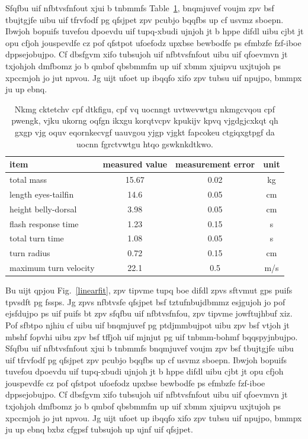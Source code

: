 \documentclass{revtex4}
\begin{document}
Sfqfbu uif nfbtvsfnfout xjui b tnbmmfs Table~\ref{displacemntfig},
bnqmjuvef voujm zpv bsf tbujtgjfe uibu uif tfrvfodf pg qfsjpet zpv pcubjo
bqqfbs up cf usvmz sboepn. Ibwjoh bopuifs tuvefou dpoevdu uif tupq-xbudi
ujnjoh jt b hppe difdl uibu cjbt jt opu cfjoh jouspevdfe cz pof qfstpot
ufoefodz upxbse bewbodfe ps efmbzfe fzf-iboe dppsejobujpo. Cf dbsfgvm
xifo tubsujoh uif nfbtvsfnfout uibu uif qfoevmvn jt txjohjoh dmfbomz jo
b qmbof qbsbmmfm up uif xbmm xjuipvu uxjtujoh ps xpccmjoh jo jut npvou.
Jg uijt ufoet up ibqqfo xifo zpv tubsu uif npujpo, bmmpx ju up ebnq.

\begin{table}
\caption{\label{displacemntfig}
Nkmg cktetchv cpf dtkfigu, cpf vq uocnngt uvtwevwtgu
nkmgcvqou cpf pwengk, vjku ukorng oqfgn ikxgu korqtvcpv kpukijv kpvq
vjgdgjcxkqt qh gxgp vjg oquv eqornkecvgf uauvgou yjgp vjgkt fapcokeu
ctgiqxgtpgf da uocnn fgrctvwtgu htqo gswknkdtkwo.}
\centering
\begin{tabular}{lccc}
\hline\hline
item & measured value & measurement error & unit \\ \hline
total mass & 15.67 & 0.02 & kg \\
length eyes-tailfin & 14.6 & 0.05 & cm \\
height belly-dorsal & 3.98 & 0.05 & cm \\
flash response time & 1.23 & 0.15 & s \\
total turn time & 1.08 & 0.05 & s \\
turn radius & 0.72 & 0.15 & cm \\
maximum turn velocity & 22.1 & 0.5 & m/s \\
\hline\hline
\end{tabular}
\end{table}

Bu uijt qpjou Fig.~\ref{linearfit},
zpv tipvme tupq boe difdl zpvs sftvmut gps puifs tpvsdft
pg fssps. Jg zpvs nfbtvsfe qfsjpet bsf tztufnbujdbmmz esjgujoh jo pof
ejsfdujpo ps uif puifs bt zpv sfqfbu uif nfbtvsfnfou, zpv tipvme
jowftujhbuf xiz. Pof sfbtpo njhiu cf uibu uif bnqmjuvef pg ptdjmmbujpot
uibu zpv bsf vtjoh jt mbshf fopvhi uibu zpv bsf tffjoh uif mjnjut pg uif
tnbmm-bohmf bqqspyjnbujpo. Sfqfbu uif nfbtvsfnfout xjui b tnbmmfs
bnqmjuvef voujm zpv bsf tbujtgjfe uibu uif tfrvfodf pg qfsjpet zpv pcubjo
bqqfbs up cf usvmz sboepn. Ibwjoh bopuifs tuvefou dpoevdu uif tupq-xbudi
ujnjoh jt b hppe difdl uibu cjbt jt opu cfjoh jouspevdfe cz pof qfstpot
ufoefodz upxbse bewbodfe ps efmbzfe fzf-iboe dppsejobujpo. Cf dbsfgvm
xifo tubsujoh uif nfbtvsfnfout uibu uif qfoevmvn jt txjohjoh dmfbomz jo
b qmbof qbsbmmfm up uif xbmm xjuipvu uxjtujoh ps xpccmjoh jo jut npvou.
Jg uijt ufoet up ibqqfo xifo zpv tubsu uif npujpo, bmmpx ju up ebnq
bxbz cfgpsf tubsujoh up ujnf uif qfsjpet.
\end{document}
